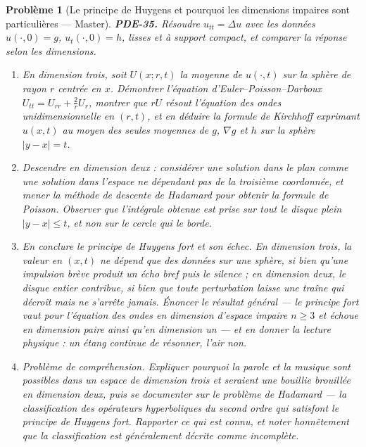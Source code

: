 \documentclass[11pt]{article}
\newtheorem{problem}{Problème}
\begin{document}
\begin{problem}[{Le principe de Huygens et pourquoi les dimensions impaires sont particulières --- Master}]
\textbf{PDE-35.} Résoudre $u_{tt} = \Delta u$ avec les données $u(\cdot,0) = g$,
$u_t(\cdot,0) = h$, lisses et à support compact, et comparer la réponse selon les
dimensions.
\begin{enumerate}
\item[(a)] En dimension trois, soit $U(x;r,t)$ la moyenne de $u(\cdot,t)$ sur la sphère de
rayon $r$ centrée en $x$. Démontrer l'équation d'Euler--Poisson--Darboux
$U_{tt} = U_{rr} + \frac{2}{r}U_r$, montrer que $rU$ résout l'équation des ondes
unidimensionnelle en $(r,t)$, et en déduire la formule de Kirchhoff exprimant $u(x,t)$ au
moyen des seules moyennes de $g$, $\nabla g$ et $h$ sur la sphère $|y - x| = t$.
\item[(b)] Descendre en dimension deux : considérer une solution dans le plan comme une solution dans
l'espace ne dépendant pas de la troisième coordonnée, et mener la méthode de descente de Hadamard
pour obtenir la formule de Poisson. Observer que l'intégrale obtenue est prise sur tout le disque
plein $|y-x| \le t$, et non sur le cercle qui le borde.
\item[(c)] En conclure le principe de Huygens fort et son échec. En dimension trois, la valeur en
$(x,t)$ ne dépend que des données sur une sphère, si bien qu'une impulsion brève produit un écho
bref puis le silence ; en dimension deux, le disque entier contribue, si bien que toute
perturbation laisse une traîne qui décroît mais ne s'arrête jamais. Énoncer le résultat général ---
le principe fort vaut pour l'équation des ondes en dimension d'espace impaire $n \ge 3$ et
échoue en dimension paire ainsi qu'en dimension un --- et en donner la lecture physique : un étang
continue de résonner, l'air non.
\item[(d)] Problème de compréhension. Expliquer pourquoi la parole et la musique sont possibles dans un
espace de dimension trois et seraient une bouillie brouillée en dimension deux, puis se documenter
sur le problème de Hadamard --- la classification des opérateurs hyperboliques du second ordre qui
satisfont le principe de Huygens fort. Rapporter ce qui est connu, et noter honnêtement que la
classification est généralement décrite comme incomplète.
\end{enumerate}

\end{problem}
\end{document}
